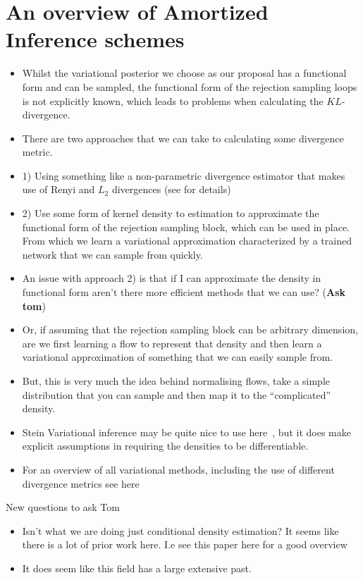 \documentclass{article}
\begin{document}
\section{ An overview of Amortized Inference schemes}
\begin{itemize}
  \item Whilst the variational posterior we choose as our proposal has a functional form 
  and can be sampled, the functional form of the rejection sampling loops is not explicitly known,
  which leads to problems when calculating the $KL$-divergence. 
  \item There are two approaches that we can take to calculating some divergence metric. 
  \item 1) Using something like a non-parametric divergence estimator that makes use of Renyi and $L_{2}$ divergences (see \cite{basseville2013divergence} for details)
  \item 2) Use some form of kernel density to estimation to approximate the functional form of the rejection sampling 
  block, which can be used in place. From which we learn a variational approximation characterized by a trained network that we can sample from quickly. 
  \item An issue with approach 2) is that if I can approximate the density in functional form aren't there more efficient methods that we can use? (\textbf{Ask tom})
  \item Or, if assuming that the rejection sampling block can be arbitrary dimension, are we first learning a flow to represent that density and then learn a variational approximation of something that we can easily sample from. 
  \item But, this is very much the idea behind normalising flows, take a simple distribution that you can sample and then map it to the ``complicated'' density. 
  \item Stein Variational inference may be quite nice to use here~\cite{feng2017learning}, but it does make explicit assumptions in requiring the densities to be differentiable. 
  \item  For an overview of all variational methods, including the use of different divergence metrics see here ~\cite{8588399}
\end{itemize}

New questions to ask Tom

\begin{itemize}
  \item Isn't what we are doing just conditional density estimation? It seems
  like there is a lot of prior work here. I.e see this paper here for a good overview ~\cite{greenberg2019automatic}
  \item It does seem like this field has a large extensive past.
\end{itemize}
\end{document}
